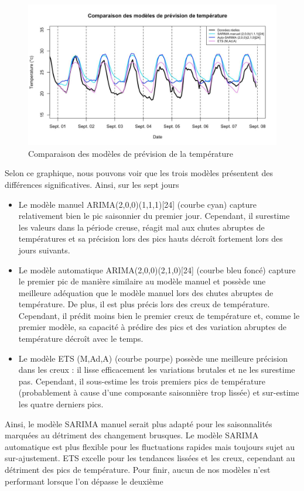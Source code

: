 \documentclass{article}
\theoremstyle{definition}
\theoremstyle{remark}
\begin{document}
\begin{figure}[!h]
    \centering
    \includegraphics[width=0.75\linewidth]{figtemp.jpg}
    \caption{Comparaison des modèles de prévision de la température}
    \label{fig:enter-label}
\end{figure}
Selon ce graphique, nous pouvons voir que les trois modèles présentent des différences significatives. Ainsi, sur les sept jours
\begin{itemize}
    \item Le modèle manuel ARIMA(2,0,0)(1,1,1)[24] (courbe cyan) capture relativement bien le pic saisonnier du premier jour. Cependant, il surestime
les valeurs dans la période creuse, réagit mal aux chutes abruptes de températures et sa précision lors des pics
hauts décroît fortement lors des jours suivants.
\item Le modèle automatique ARIMA(2,0,0)(2,1,0)[24] (courbe bleu foncé) capture le premier pic de manière similaire au modèle manuel et possède une meilleure adéquation que le modèle manuel lors des chutes abruptes de température. De plus, il est plus précis lors des creux de température. Cependant, il prédit moins bien le premier creux de température et, comme le premier modèle, sa capacité à prédire
des pics et des variation abruptes de température décroît avec le temps.
\item Le modèle ETS (M,Ad,A) (courbe pourpe) possède une meilleure précision
dans les creux : il lisse efficacement les variations brutales et ne les surestime pas. Cependant, il sous-estime les trois premiers pics de température (probablement à cause d’une composante saisonnière trop lissée) et sur-estime les quatre derniers pics.
\end{itemize} 
Ainsi, le modèle SARIMA manuel serait plus adapté pour les saisonnalités marquées au détriment des changement brusques. Le modèle SARIMA automatique est plus flexible pour les fluctuations rapides mais toujours sujet au sur-ajustement. ETS excelle pour les tendances lissées et les creux, cependant au détriment des pics de température. Pour finir, aucun de nos modèles n’est performant lorsque l’on dépasse le deuxième
\end{document}
